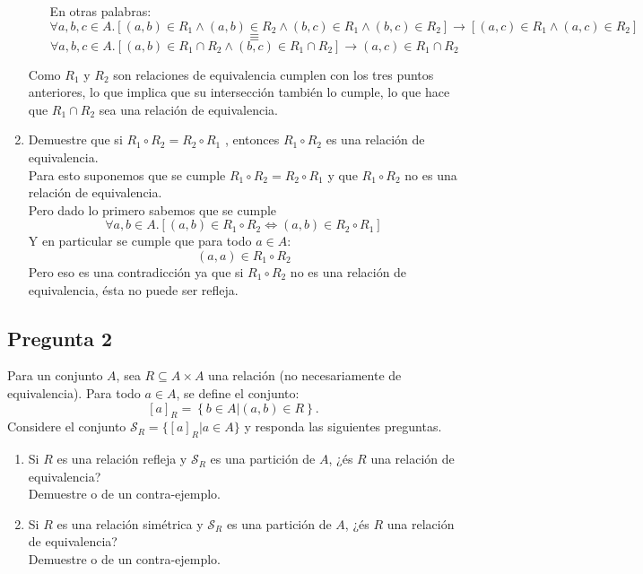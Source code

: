 \documentclass[letter]{article}
\begin{document}
\begin{pregunta}{1}
\begin{enumerate}
\begin{itemize}
		En otras palabras:
		$$\forall a,b,c \in A. [(a,b)\in R_1 \wedge (a,b)\in R_2 \wedge (b,c)\in R_1 \wedge (b,c)\in R_2]\rightarrow [(a,c)\in R_1 \wedge (a,c) \in R_2]$$
		$$\equiv$$
		$$\forall a,b,c\in A. [(a,b)\in R_1\cap R_2 \wedge (b,c)\in R_1\cap R_2] \rightarrow (a,c)\in R_1\cap R_2$$
		\end{itemize}
		Como $R_1$ y $R_2$ son relaciones de equivalencia cumplen con los tres puntos anteriores, lo que implica que su intersección también lo cumple, lo que hace que $R_1\cap R_2$ sea una relación de equivalencia.
		\item Demuestre que si $R_1 \circ R_2=R_2 \circ R_1 $ , entonces $R_1 \circ R_2$ es una relación de equivalencia.\\
		
		Para esto suponemos que se cumple $R_1 \circ R_2=R_2\circ R_1$ y que $R_1 \circ R_2$ no es una relación de equivalencia.\\
		Pero dado lo primero sabemos que se cumple 
		$$\forall a,b \in A. [(a,b)\in R_1\circ R_2 \Leftrightarrow (a,b)\in R_2\circ R_1]$$
		Y en particular se cumple que para todo $a\in A$:
		$$(a,a)\in R_1\circ R_2$$
		Pero eso es una contradicción ya que si $R_1\circ R_2$ no es una relación de equivalencia, ésta no puede ser refleja.
		\end{enumerate}
		
	\end{pregunta}
	
	\begin{pregunta}{2}
		\section*{Pregunta 2}
		Para un conjunto $A$, sea $R\subseteq A\times A$ una relación (no necesariamente de equivalencia). Para todo $a\in A$, se define el conjunto:
		$$ [a]_{R}=\left\lbrace b\in A | (a,b)\in R\right\rbrace.$$
		Considere el conjunto $\mathcal{S}_R=\{[a]_R|a\in A\}$ y responda las siguientes preguntas.
		\begin{enumerate}
		\item Si $R$ es una relación refleja y $\mathcal{S}_R$ es una partición de $A$, ¿és $R$ una relación de equivalencia?\\
		Demuestre o de un contra-ejemplo.
		\item Si $R$ es una relación simétrica y $\mathcal{S}_R$ es una partición de $A$, ¿és $R$ una relación de equivalencia?\\
		Demuestre o de un contra-ejemplo.
		\end{enumerate}
		
	\end{pregunta}
\end{document}
